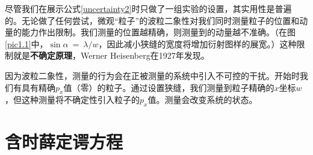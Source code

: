 \documentclass[12pt,a4paper,openany]{ctexbook}
\begin{document}
\begin{flushleft}
尽管我们在展示公式\eqref{uncertainty2}时只做了一组实验的设置，其实用性是普遍的。无论做了任何尝试，微观“粒子”的波粒二象性对我们同时测量粒子的位置和动量的能力作出限制。我们测量的位置越精确，则测量到的动量越不准确。（在图\ref{pic1.1}中，$\sin \alpha\ =\ \lambda/w$，因此减小狭缝的宽度将增加衍射图样的展宽。）这种限制就是\textbf{不确定原理}，Werner Heisenberg在1927年发现。

因为波粒二象性，测量的行为会在正被测量的系统中引入不可控的干扰。开始时我们有具有精确$p_x$值（零）的粒子。通过设置狭缝，我们测量到粒子精确的$x$坐标$w$，但这种测量将不确定性引入粒子的$p_x$值。测量会改变系统的状态。
\end{flushleft}
\section{含时薛定谔方程}
\end{document}
